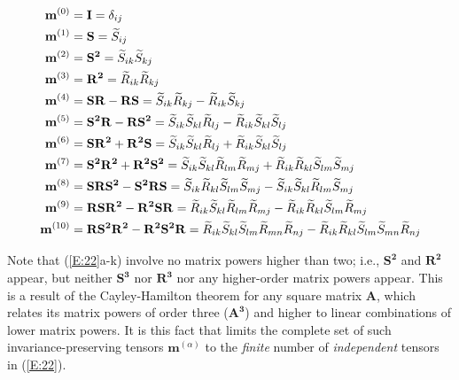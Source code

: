 \begin{subequations}
\label{E:22} \vspace{-0.25in}
\begin{align}
 	\mathbf{m}^{(0)} &= \mathbf{I} = \delta_{ij} \\
	\mathbf{m}^{(1)} &= \mathbf{S} = \widetilde{S}_{ij} \\
	\mathbf{m}^{(2)} &= \mathbf{S^2} = \widetilde{S}_{ik} \widetilde{S}_{kj} \\
	\mathbf{m}^{(3)} &= \mathbf{R^2} = \widetilde{R}_{ik} \widetilde{R}_{kj} \\
	\mathbf{m}^{(4)} &= \mathbf{SR - RS} = \widetilde{S}_{ik} \widetilde{R}_{kj} 
	- \widetilde{R}_{ik} \widetilde{S}_{kj} \\
	\mathbf{m}^{(5)} &= \mathbf{S^2R - RS^2} 
	= 	\widetilde{S}_{ik} \widetilde{S}_{kl} \widetilde{R}_{lj} 
	-   \widetilde{R}_{ik} \widetilde{S}_{kl} \widetilde{S}_{lj} \\
	\mathbf{m}^{(6)} &= \mathbf{SR^2 + R^2S} 
	= 	\widetilde{S}_{ik} \widetilde{S}_{kl} \widetilde{R}_{lj} 
	+   \widetilde{R}_{ik} \widetilde{S}_{kl} \widetilde{S}_{lj} \\
	\mathbf{m}^{(7)} &= \mathbf{S^2R^2 + R^2S^2} 
	= 	\widetilde{S}_{ik} \widetilde{S}_{kl} \widetilde{R}_{lm} \widetilde{R}_{mj}  
	+   \widetilde{R}_{ik} \widetilde{R}_{kl} \widetilde{S}_{lm} \widetilde{S}_{mj} \\
	\mathbf{m}^{(8)} &= \mathbf{SRS^2 - S^2RS} 
	= 	\widetilde{S}_{ik} \widetilde{R}_{kl} \widetilde{S}_{lm} \widetilde{S}_{mj}  
	-   \widetilde{S}_{ik} \widetilde{S}_{kl} \widetilde{R}_{lm} \widetilde{S}_{mj} \\
	\mathbf{m}^{(9)} &= \mathbf{RSR^2 - R^2SR} 
	= 	\widetilde{R}_{ik} \widetilde{S}_{kl} \widetilde{R}_{lm} \widetilde{R}_{mj}  
	-   \widetilde{R}_{ik} \widetilde{R}_{kl} \widetilde{S}_{lm} \widetilde{R}_{mj} \\
	\mathbf{m}^{(10)} &= \mathbf{RS^2R^2 - R^2S^2R} 
	= 	\widetilde{R}_{ik} \widetilde{S}_{kl} \widetilde{S}_{lm} \widetilde{R}_{mn} \widetilde{R}_{nj} 
	-   \widetilde{R}_{ik} \widetilde{R}_{kl} \widetilde{S}_{lm} \widetilde{S}_{mn} \widetilde{R}_{nj}
\end{align}
\end{subequations}
%
%      
	  	
Note that (\ref{E:22}a-k) involve no matrix powers higher than two; i.e., $\mathbf{S^2}$ and $\mathbf{R^2}$  appear, but neither $\mathbf{S^3}$  nor $\mathbf{R^3}$  nor any higher-order matrix powers appear. This is a result of the Cayley-Hamilton theorem for any square matrix $\mathbf{A}$, which relates its matrix powers of order three ($\mathbf{A^3}$) and higher to linear combinations of lower matrix powers. It is this fact that limits the complete set of such invariance-preserving tensors  $\mathbf{m}^{(\alpha)}$  to the \textit{finite} number of \textit{independent} tensors in (\ref{E:22}).

